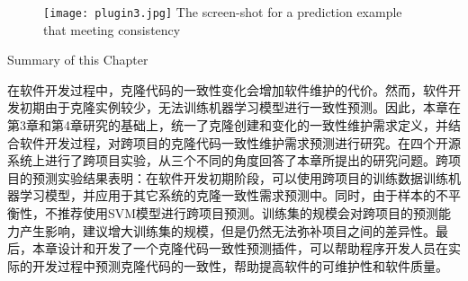 \begin{figure}[htbp]
\centering
\texttt{[image: plugin3.jpg]}
{The screen-shot for a prediction example that meeting consistency}
\vspace{-1em}
\end{figure}



{Summary of this Chapter}

在软件开发过程中，克隆代码的一致性变化会增加软件维护的代价。然而，软件开发初期由于克隆实例较少，无法训练机器学习模型进行一致性预测。因此，本章在第3章和第4章研究的基础上，统一了克隆创建和变化的一致性维护需求定义，并结合软件开发过程，对跨项目的克隆代码一致性维护需求预测进行研究。在四个开源系统上进行了跨项目实验，从三个不同的角度回答了本章所提出的研究问题。跨项目的预测实验结果表明：在软件开发初期阶段，可以使用跨项目的训练数据训练机器学习模型，并应用于其它系统的克隆一致性需求预测中。同时，由于样本的不平衡性，不推荐使用SVM模型进行跨项目预测。训练集的规模会对跨项目的预测能力产生影响，建议增大训练集的规模，但是仍然无法弥补项目之间的差异性。最后，本章设计和开发了一个克隆代码一致性预测插件，可以帮助程序开发人员在实际的开发过程中预测克隆代码的一致性，帮助提高软件的可维护性和软件质量。